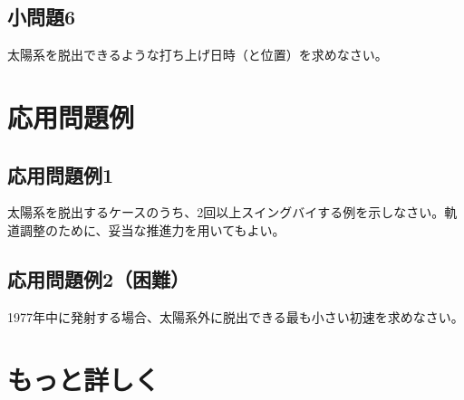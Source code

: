 \documentclass{article}
\begin{document}
\subsection{ 小問題6 }

太陽系を脱出できるような打ち上げ日時（と位置）を求めなさい。

\section{ 応用問題例 }

\subsection{ 応用問題例1 }

太陽系を脱出するケースのうち、2回以上スイングバイする例を示しなさい。軌道調整のために、妥当な推進力を用いてもよい。

\subsection{ 応用問題例2（困難） }

1977年中に発射する場合、太陽系外に脱出できる最も小さい初速を求めなさい。

\section{ もっと詳しく }
\end{document}
